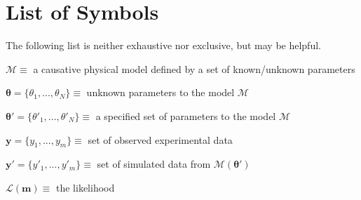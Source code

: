 \chapter{List of Symbols}


The following list is neither exhaustive nor exclusive, but may be helpful.
\begin{list}{}{%
\setlength{\labelwidth}{24mm}
\setlength{\leftmargin}{10mm}}
\item $\mathcal{M} \equiv$ a causative physical model defined by a set of known/unknown parameters
\item $\bm{\theta} = \{\theta_1,...,\theta_N\} \equiv$ unknown parameters to the model $\mathcal{M}$
\item $\bm{\theta'} = \{\theta'_1,...,\theta'_N\} \equiv$ a specified set of parameters to the model $\mathcal{M}$
\item $\bm{y} = \{y_1,...,y_m\} \equiv$ set of observed experimental data
\item $\bm{y'} = \{y'_1,...,y'_m\} \equiv$ set of simulated data from $\mathcal{M}(\bm{\theta'})$
\item $\mathcal{L}(\bm{m}) \equiv$ the likelihood 
\end{list}

